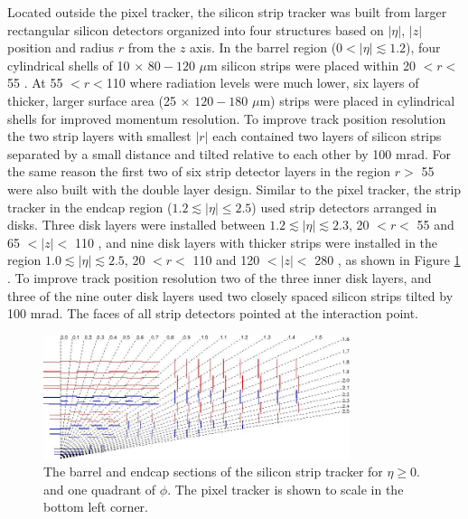 Located outside the pixel tracker, the silicon strip tracker was built from larger rectangular silicon detectors 
organized into four structures based on $|\eta|$, $|z|$ position and radius $r$ from the $z$ axis.  In the barrel region 
($0 < |\eta| \lesssim 1.2$), four cylindrical shells of 10 \cm $\times$ $80-120$ $\mu$m silicon strips were placed within 20 $< r <$ 55 \cm.  At
55 $< r < $110 \cm where radiation levels were much lower, six layers of thicker, larger surface area (25 \cm $\times$ $120-180$ $\mu$m) 
strips were placed in cylindrical shells for improved momentum resolution.  To improve track position resolution the two strip layers with smallest 
$|r|$ each contained two layers of silicon strips separated by a small distance and tilted relative 
to each other by 100 mrad.  For the same reason the first two of six strip detector layers in the region $r >$ 55 \cm 
were also built with the double layer design.  Similar to the pixel tracker, the strip tracker in the endcap region 
($1.2 \lesssim |\eta| \leq 2.5$) used strip detectors arranged in disks.  Three disk layers were installed between 
$1.2 \lesssim |\eta| \lesssim 2.3$, 20 $< r <$ 55 \cm and 65 $< |z| <$ 110 \cm, and nine disk layers with thicker strips were installed in 
the region $1.0 \lesssim |\eta| \lesssim 2.5$, 20 $< r <$ 110 \cm and 120 $< |z| < $ 280 \cm, as shown in Figure \ref{fig:stripTracker} \cite{cmsTDR}.  
To improve track position resolution two of the three inner disk layers, and three of the nine outer disk layers 
used two closely spaced silicon strips tilted by 100 mrad.  The faces of all strip detectors pointed at the interaction 
point.

\begin{figure}[ht]
	\centering
	\includegraphics[width=0.8\textwidth]{figures/siliconStripAndPixelDetectorTwoDimView.png}
	\caption{The barrel and endcap sections of the silicon strip tracker for $\eta \geq 0.$ and one quadrant of $\phi$.  The pixel tracker is shown to scale in the bottom left corner.}
	\label{fig:stripTracker}
\end{figure}

